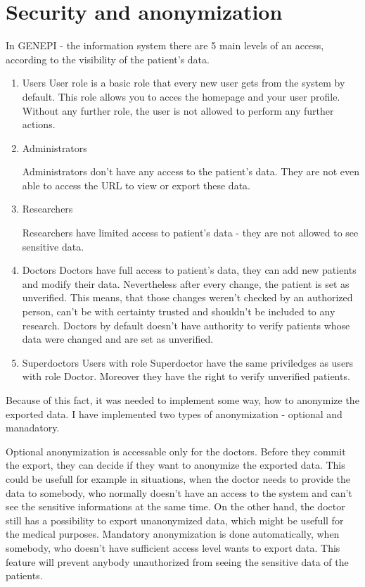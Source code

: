 \documentclass[thesis=B,english]{FITthesis}[2012/10/20]
\begin{document}
\section{Security and anonymization}
In GENEPI - the information system there are 5 main levels of an access, according to the visibility of the patient's data.
\begin{enumerate}
\item{Users}
User role is a basic role that every new user gets from the system by default. This role allows you to acces the homepage and your user profile. Without any further role, the user is not allowed to perform any further actions.

\item{Administrators}

Administrators don't have any access to the patient's data. They are not even able to access the URL to view or export these data.
\item{Researchers}

Researchers have limited access to patient's data - they are not allowed to see sensitive data.
\item{Doctors}
Doctors have full access to patient's data, they can add new patients and modify their data. Nevertheless after every change, the patient is set as unverified. This means, that those changes weren't checked by an authorized person, can't be with certainty trusted and shouldn't be included to any research. Doctors by default doesn't have authority to verify patients whose data were changed and are set as unverified.

\item{Superdoctors}
Users with role Superdoctor have the same priviledges as users with role Doctor. Moreover they have the right to verify unverified patients.

\end{enumerate}
Because of this fact, it was needed to implement some way, how to anonymize the exported data. I have implemented two types of anonymization - optional and manadatory.

Optional anonymization is accessable only for the doctors. Before they commit the export, they can decide if they want to anonymize the exported data. This could be usefull for example in situations, when the doctor needs to provide the data to somebody, who normally doesn't have an access to the system and can't see the sensitive informations at the same time. On the other hand, the doctor still has a possibility to export unanonymized data, which might be usefull for the medical purposes.
Mandatory anonymization is done automatically, when somebody, who doesn't have sufficient access level wants to export data. This feature will prevent anybody unauthorized from seeing the sensitive data of the patients.
\end{document}
